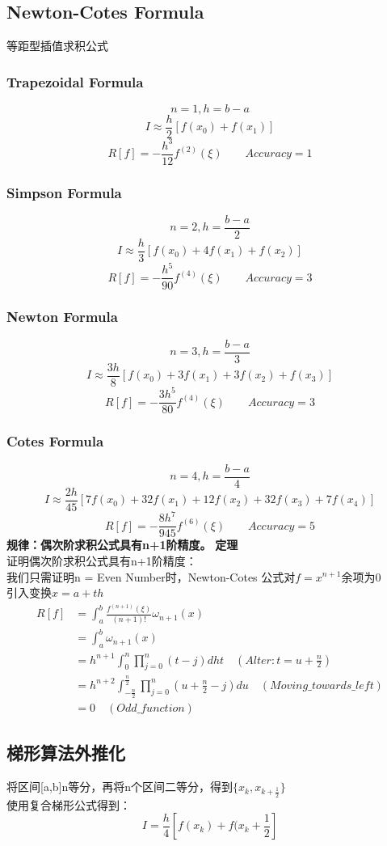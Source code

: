 \documentclass[12pt]{article}
\begin{document}
\begin{CJK*}{UTF8}{gbsn}
\begin{spacing}{1.5}
\subsection{Newton-Cotes Formula}
等距型插值求积公式
\subsubsection{Trapezoidal Formula}
    $$n = 1,h = b-a$$
    $$I \approx \frac{h}{2}[f(x_0)+f(x_1)]$$
    $$R[f] = -\frac{h^3}{12}f^{(2)}(\xi) \qquad Accuracy = 1$$
\subsubsection{Simpson Formula}
    $$n = 2,h = \frac{b-a}{2}$$
    $$I \approx \frac{h}{3}[f(x_0) + 4f(x_1)+f(x_2)]$$
    $$R[f] = -\frac{h^5}{90}f^{(4)}(\xi) \qquad Accuracy = 3$$
\subsubsection{Newton Formula}
    $$n = 3,h = \frac{b-a}{3}$$
    $$I \approx \frac{3h}{8}[f(x_0)+3f(x_1)+3f(x_2)+f(x_3)]$$
    $$R[f] = -\frac{3h^5}{80}f^{(4)}(\xi) \qquad Accuracy = 3$$
\subsubsection{Cotes Formula}
    $$n = 4,h = \frac{b-a}{4}$$
    $$I \approx \frac{2h}{45}[7f(x_0)+32f(x_1)+12f(x_2)+32f(x_3) +7f(x_4)]$$
    $$R[f] = -\frac{8h^7}{945}f^{(6)}(\xi) \qquad Accuracy = 5$$
\textbf{规律：偶次阶求积公式具有n+1阶精度。}
\newpage
\textbf{定理}\\
    证明偶次阶求积公式具有n+1阶精度：\\
    我们只需证明n = Even Number时，Newton-Cotes 公式对$f = x^{n+1}$余项为0\\
    引入变换$x = a + th$
    $$
    \begin{aligned}
        R[f] &= \int_a^b\frac{f^{(n+1)}(\xi)}{(n+1)!}\omega_{n+1}(x)\\
             &= \int_a^b \omega_{n+1}(x)\\
             &= h^{n+1}\int_0^n \prod_{j=0}^n(t-j)dht\quad(Alter: t=u+\frac{n}{2})\\  
             &= h^{n+2}\int_{-\frac{n}{2}}^{\frac{n}{2}}\prod_{j=0}^n(u+\frac{n}{2}-j)du \quad (Moving\_towards\_left)\\
             &= 0 \quad (Odd\_function)
    \end{aligned}
    $$
    






    \subsection{梯形算法外推化}
        将区间[a,b]n等分，再将n个区间二等分，得到$\{x_k,x_{k +\frac{1}{2}}\}$ \\
        使用复合梯形公式得到：
        \[
            I = \frac{h}{4}[f(x_k) + f(x_k+\frac{1}{2}]
        \]   
        
        
\end{spacing}        
\end{CJK*}
\end{document}
